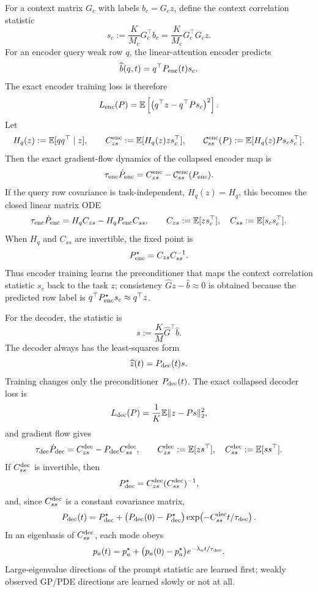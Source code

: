 \documentclass[11pt,a4paper]{article}
\theoremstyle{definition}
\newcommand{\E}{\mathbb E}
\newcommand{\wh}{\widehat}
\begin{document}
For a context matrix $G_c$ with labels $b_c=G_cz$, define the context
correlation statistic
\[
    s_c:=\frac{K}{M_c}G_c^\top b_c
    =
    \frac{K}{M_c}G_c^\top G_cz .
\]
For an encoder query weak row $q$, the linear-attention encoder predicts
\[
    \wh b(q,t)=q^\top P_{\rm enc}(t)s_c .
\]
The exact encoder training loss is therefore
\[
    L_{\rm enc}(P)
    =
    \E\left[
        \bigl(q^\top z-q^\top Ps_c\bigr)^2
    \right].
\]
Let
\[
    H_q(z):=\E[q q^\top\mid z],
    \qquad
    C^{\rm enc}_{zs}:=\E[H_q(z)zs_c^\top],
    \qquad
    \mathcal C^{\rm enc}_{ss}(P):=\E[H_q(z)P s_cs_c^\top].
\]
Then the exact gradient-flow dynamics of the collapsed encoder map is
\[
    \tau_{\rm enc}\dot P_{\rm enc}
    =
    C^{\rm enc}_{zs}
    -
    \mathcal C^{\rm enc}_{ss}(P_{\rm enc}).
\]
If the query row covariance is task-independent, $H_q(z)=H_q$, this becomes
the closed linear matrix ODE
\[
    \tau_{\rm enc}\dot P_{\rm enc}
    =
    H_qC_{zs}-H_qP_{\rm enc}C_{ss},
    \qquad
    C_{zs}:=\E[zs_c^\top],
    \quad
    C_{ss}:=\E[s_cs_c^\top].
\]
When $H_q$ and $C_{ss}$ are invertible, the fixed point is
\[
    P_{\rm enc}^{\star}=C_{zs}C_{ss}^{-1}.
\]
Thus encoder training learns the preconditioner that maps the context
correlation statistic $s_c$ back to the task $z$; consistency
$\wh Gz-\wh b\approx0$ is obtained because the predicted row label is
$q^\top P_{\rm enc}^{\star}s_c\approx q^\top z$.

For the decoder, the statistic is
\[
    s:=\frac{K}{M}\wh G^\top\wh b .
\]
The decoder always has the least-squares form
\[
    \wh z(t)=P_{\rm dec}(t)s.
\]
Training changes only the preconditioner $P_{\rm dec}(t)$.  The exact
collapsed decoder loss is
\[
    L_{\rm dec}(P)=\frac1K\E\|z-Ps\|_2^2,
\]
and gradient flow gives
\[
    \tau_{\rm dec}\dot P_{\rm dec}
    =
    C^{\rm dec}_{zs}-P_{\rm dec}C^{\rm dec}_{ss},
    \qquad
    C^{\rm dec}_{zs}:=\E[zs^\top],
    \quad
    C^{\rm dec}_{ss}:=\E[ss^\top].
\]
If \(C^{\rm dec}_{ss}\) is invertible, then
\[
    P_{\rm dec}^{\star}
    =
    C^{\rm dec}_{zs}
    (C^{\rm dec}_{ss})^{-1},
\]
and, since \(C^{\rm dec}_{ss}\) is a constant covariance matrix,
\[
    P_{\rm dec}(t)
    =
    P_{\rm dec}^{\star}
    +
    \bigl(P_{\rm dec}(0)-P_{\rm dec}^{\star}\bigr)
    \exp\!\left(-C^{\rm dec}_{ss}t/\tau_{\rm dec}\right)
.
\]
In an eigenbasis of \(C^{\rm dec}_{ss}\), each mode obeys
\[
    p_a(t)
    =
    p_a^\star
    +
    \bigl(p_a(0)-p_a^\star\bigr)
    e^{-\lambda_a t/\tau_{\rm dec}}.
\]
Large-eigenvalue directions of the prompt statistic are learned first; weakly
observed GP/PDE directions are learned slowly or not at all.
\end{document}
